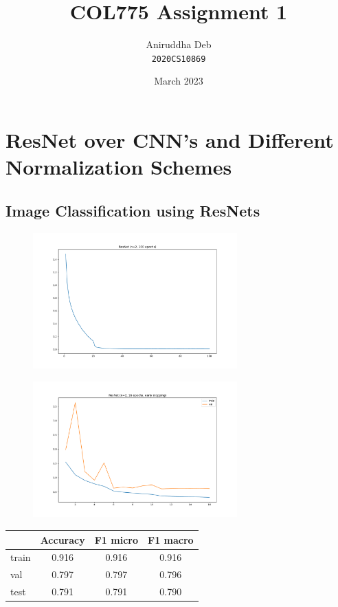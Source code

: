 \documentclass[12pt]{article}
\title{\textbf{COL775 Assignment 1}}
\author{Aniruddha Deb \\ \texttt{2020CS10869}}
\date{March 2023}
\begin{document}
\maketitle

\section{ResNet over CNN's and Different Normalization Schemes}

\subsection{Image Classification using ResNets}

\begin{figure}[!htbp]
    \centering
    \includegraphics[width=0.7\textwidth]{../ResNet/q1_part2.pdf}
\end{figure}

\begin{figure}[!htbp]
    \centering
    \includegraphics[width=0.7\textwidth]{../ResNet/q1_part3.pdf}
\end{figure}

\begin{center}
\begin{tabular}{|l|c|c|c|}
    \hline
    & Accuracy & F1 micro & F1 macro \\ 
    \hline
    train & 0.916 & 0.916 & 0.916 \\
    val & 0.797 & 0.797 & 0.796 \\
    test & 0.791 & 0.791 & 0.790 \\
    \hline
\end{tabular}
\end{center}
\end{document}
